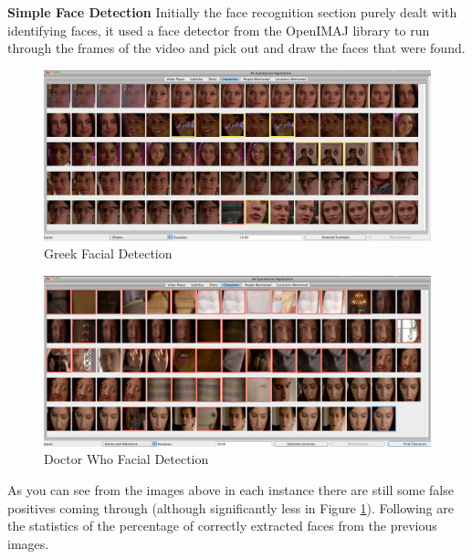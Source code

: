 \textbf{Simple Face Detection}
\newline
Initially the face recognition section purely dealt with identifying faces, it used a face detector from the OpenIMAJ library \cite{citeOpenImaj} to run through the frames of the video and pick out and draw the faces that were found.

\begin{figure}[h1]
\begin{center}
 \includegraphics[trim = 0mm 0mm 0mm 0mm, clip,
 scale=0.265]{Images/GreekFacialDetection.png}
  \caption{Greek Facial Detection}
 \label{fig:GreekFD}
 \end{center}
\end{figure}

\begin{figure}[h1]
\begin{center}
 \includegraphics[trim = 0mm 0mm 0mm 0mm, clip,
 scale=0.265]{Images/DrWhoFacialDetection.png}
  \caption{Doctor Who Facial Detection}
 \label{fig:DrWhoFD}
 \end{center}
\end{figure}

\newpage

As you can see from the images above in each instance there are still some false positives coming through (although significantly less in Figure \ref{fig:GreekFD}). Following are the statistics of the percentage of correctly extracted faces from the previous images.

